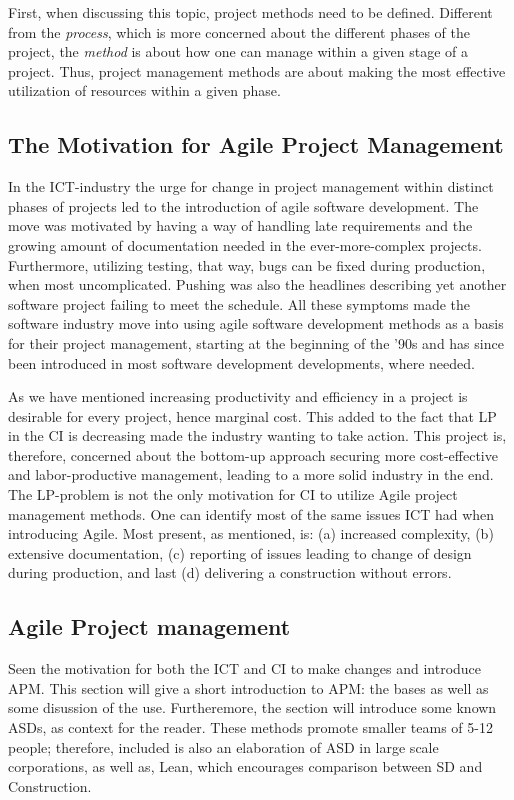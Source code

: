 First, when discussing this topic, project methods need to be defined. Different from the \textit{process}, which is more concerned about the different phases of the project, the \textit{method} is about how one can manage within a given stage of a project. Thus, project management methods are about making the most effective utilization of resources within a given phase. 

\subsection{The Motivation for Agile Project Management}
In the ICT-industry the urge for change in project management within distinct phases of projects led to the introduction of agile software development. The move was motivated by having a way of handling late requirements and the growing amount of documentation needed in the ever-more-complex projects. Furthermore, utilizing testing, that way, bugs can be fixed during production, when most uncomplicated. Pushing was also the headlines describing yet another software project failing to meet the schedule. All these symptoms made the software industry move into using agile software development methods as a basis for their project management, starting at the beginning of the '90s and has since been introduced in most software development developments, where needed.  

As we have mentioned increasing productivity and efficiency in a project is desirable for every project, hence marginal cost. This added to the fact that LP in the CI is decreasing made the industry wanting to take action. This project is, therefore, concerned about the bottom-up approach securing more cost-effective and labor-productive management, leading to a more solid industry in the end. The LP-problem is not the only motivation for CI to utilize Agile project management methods. One can identify most of the same issues ICT had when introducing Agile. Most present, as mentioned, is: (a) increased complexity, (b) extensive documentation, (c) reporting of issues leading to change of design during production, and last (d) delivering a construction without errors.

\subsection{Agile Project management}
Seen the motivation for both the ICT and CI to make changes and introduce APM. This section will give a short introduction to APM: the bases as well as some disussion of the use. Furtheremore, the section will introduce some known ASDs, as context for the reader. These methods promote smaller teams of 5-12 people; therefore, included is also an elaboration of ASD in large scale corporations, as well as, Lean, which encourages comparison between SD and Construction. 

